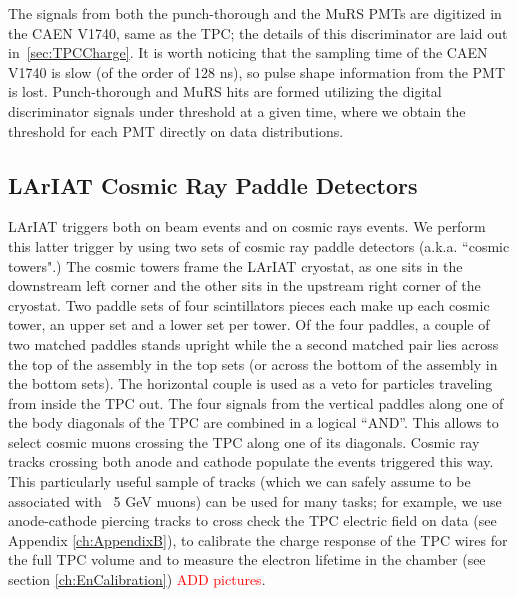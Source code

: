The signals from both the punch-thorough and the MuRS PMTs are digitized in the CAEN V1740, same as the TPC; the details of this discriminator are laid out in~\ref{sec:TPCCharge}. It is worth noticing that the sampling time of the CAEN V1740 is slow (of the order of 128 ns), so pulse shape information from the PMT is lost.
Punch-thorough and MuRS hits are formed utilizing the digital discriminator signals under threshold at a given time, where we obtain the threshold for each PMT directly on data distributions.



\subsection{LArIAT Cosmic Ray Paddle Detectors}\label{sec:CosmicRayPaddle}
LArIAT triggers both on beam events and on cosmic rays events. We perform this latter trigger by using two sets of cosmic ray paddle detectors (a.k.a. ``cosmic towers".) The cosmic towers frame the LArIAT cryostat, as one sits in the downstream left corner and the other sits in the upstream right corner of the cryostat. Two paddle sets of four scintillators pieces each make up each cosmic tower, an upper set and a lower set per tower. 
Of the four paddles, a couple of two matched paddles stands upright while the a second matched pair lies across the top of the assembly in the top sets (or across the bottom of the assembly in the bottom sets). The horizontal couple is used as a veto for particles traveling from inside the TPC out.  The four signals  from the vertical paddles along one of the body diagonals of the TPC are combined in a logical ``AND''. This allows to select cosmic muons crossing the TPC along one of its diagonals.  Cosmic ray tracks crossing both anode and cathode populate the events triggered this way. This particularly useful sample of tracks (which we can safely assume to be associated with ~5 GeV muons) can be used for many tasks; for example, we use anode-cathode piercing tracks to cross check the TPC electric field on data (see Appendix \ref{ch:AppendixB}), to calibrate the charge response of the TPC wires for the full TPC volume and to measure the electron lifetime in the chamber (see section \ref{ch:EnCalibration})\textcolor{red}{ ADD pictures}.

